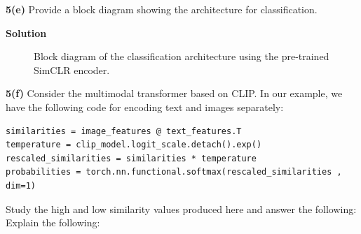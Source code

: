 \documentclass[10pt]{article}
\begin{document}
\newpage

\textbf{5(e)} Provide a block diagram showing the architecture for classification.

\textbf{Solution}

\begin{figure}[H]
	\centering
	\caption{Block diagram of the classification architecture using the pre-trained SimCLR encoder.}
	\label{fig:simclr_classification}
\end{figure}

\newpage

\textbf{5(f)} Consider the multimodal transformer based on CLIP. In our example, we have the following code for encoding text and images separately:

\begin{lstlisting}
similarities = image_features @ text_features.T
temperature = clip_model.logit_scale.detach().exp()
rescaled_similarities = similarities * temperature
probabilities = torch.nn.functional.softmax(rescaled_similarities , dim=1)
\end{lstlisting}

Study the high and low similarity values produced here and answer the following: Explain the following:
\end{document}

